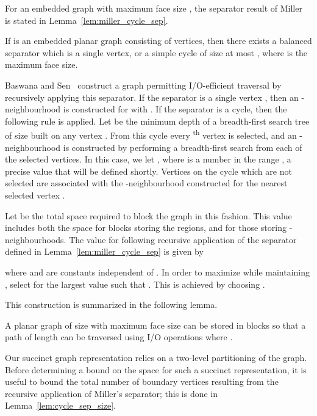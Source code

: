 For an embedded graph  with maximum face size ,
the separator result of Miller~\cite{miller_1986} is 
stated in Lemma~\ref{lem:miller_cycle_sep}.

\begin{lemma}\label{lem:miller_cycle_sep}
If  is an embedded planar graph consisting of  vertices, then
there exists a balanced separator which is a single vertex, or a simple cycle
of size at most ,
where  is the maximum face size.
\end{lemma}

Baswana and Sen~\cite{DBLP:journals/algorithmica/BaswanaS02}
construct a graph permitting {I/O}-efficient traversal by recursively
applying this separator.
If the separator is a single vertex , then an -neighbourhood
is constructed for  with . 
If the separator is a cycle, then the following rule is applied.
Let  be the minimum depth of a
breadth-first search tree of size  built on any vertex .
From this cycle every \textsuperscript{th}
vertex is selected, and an -neighbourhood is constructed 
by performing a breadth-first search from each of the selected 
vertices.
In this case, we let , where  is
a number in the range , a precise value that will be
defined shortly.
Vertices on the cycle which are not selected are associated with the
-neighbourhood constructed for the nearest selected vertex .

Let  be the total space required to block 
the graph in this fashion.
This value includes both the space for blocks storing the
regions, and for those storing -neighbourhoods.
The value for  following recursive application of the 
separator defined in Lemma~\ref{lem:miller_cycle_sep} is
given by



where  and  are constants independent of .
In order to maximize  while maintaining ,
select for  the largest value  such that 
.
This is achieved by choosing 
.

This construction is summarized in the following lemma.

\begin{lemma}
  A planar graph  of size  with maximum face size  
  can be stored in
   blocks so that a path of length  can
  be traversed using  I/O operations
  where .
\end{lemma}

Our succinct graph representation relies on a two-level partitioning of 
the graph.
Before determining a bound on the space for such a succinct representation,
it is useful to bound the total number of boundary vertices 
resulting from the recursive application of Miller's separator; this is 
done in Lemma~\ref{lem:cycle_sep_size}.

